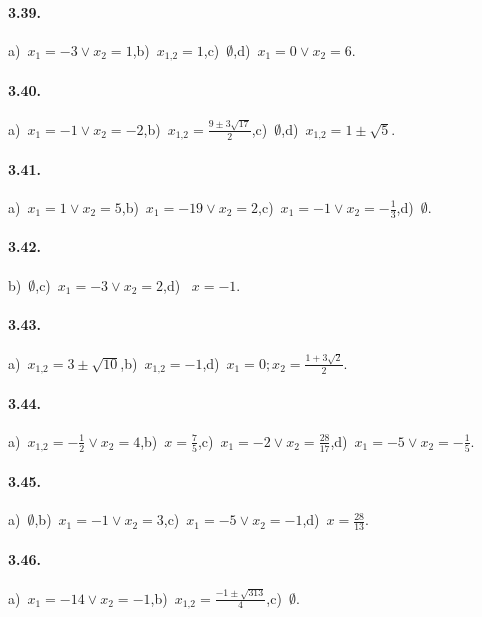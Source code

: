 \paragraph{3.39.} a)~$x_{1} =-3 \vee x_{2} = 1$,\quad b)~$x_{1\text{,}2}= 1$,\quad c)~$\emptyset$,\quad d)~$x_{1} = 0 \vee x_{2} = 6$.

\paragraph{3.40.} a)~$x_{1} =-1 \vee x_{2} =-2$,\quad b)~$x_{1\text{,}2} = \frac{9 \pm 3 \sqrt{17}}{2}$,\quad c)~$\emptyset$,\quad d)~$x_{1\text{,}2} = 1 \pm \sqrt{5}$.

\paragraph{3.41.} a)~$x_{1} = 1 \vee x_{2} = 5$,\quad b)~$x_{1} =-19 \vee x_{2} = 2$,\quad c)~$x_{1} =-1 \vee x_{2} =-\frac{1}{3}$,\quad d)~$\emptyset$.

\paragraph{3.42.} b)~$\emptyset$,\quad c)~$x_{1} =-3 \vee x_{2} = 2$,\quad d)~ $x =-1$.

\paragraph{3.43.} a)~$x_{1\text{,}2} = 3 \pm \sqrt{10}$,\quad b)~$x_{1\text{,}2}=-1$,\quad d)~$x_{1} = 0;x_{2} = \frac{1 + 3 \sqrt{2}}{2}$.

\paragraph{3.44.} a)~$x_{1\text{,}2} =-\frac{1}{2} \vee x_{2} = 4$,\quad b)~$x=\frac{7}{5}$,\quad c)~$x_{1} =-2 \vee x_{2} = \frac{28}{17}$,\quad d)~$x_{1} =-5 \vee x_{2} =-\frac{1}{5}$.

\paragraph{3.45.} a)~$\emptyset$,\quad b)~$x_{1} =-1 \vee x_{2} = 3$,\quad c)~$x_{1} =-5 \vee x_{2} =-1$,\quad d)~$x = \frac{28}{13}$.

\paragraph{3.46.} a)~$x_{1} =-14 \vee x_{2} =-1$,\quad b)~$x_{1\text{,}2} = \frac{- 1 \pm \sqrt{313}}{4}$,\quad c)~$\emptyset$.

